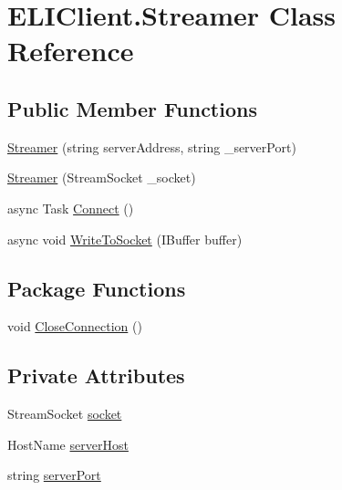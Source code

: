 \hypertarget{class_e_l_i_client_1_1_streamer}{}\section{E\+L\+I\+Client.\+Streamer Class Reference}
\label{class_e_l_i_client_1_1_streamer}
\subsection*{Public Member Functions}
\begin{DoxyCompactItemize}
\item 
\hyperlink{class_e_l_i_client_1_1_streamer_af385f8c92474d6dd8e62c7ac00b098a1}{Streamer} (string server\+Address, string \+\_\+server\+Port)
\item 
\hyperlink{class_e_l_i_client_1_1_streamer_aeed10276bc5127d45abbeb88aa03ac00}{Streamer} (Stream\+Socket \+\_\+socket)
\item 
async Task \hyperlink{class_e_l_i_client_1_1_streamer_aee0823494f123fb1a8ad2ab136cf74f5}{Connect} ()
\item 
async void \hyperlink{class_e_l_i_client_1_1_streamer_af88e4f7491aa8ca6cfdc6de6786fd89c}{Write\+To\+Socket} (I\+Buffer buffer)
\end{DoxyCompactItemize}
\subsection*{Package Functions}
\begin{DoxyCompactItemize}
\item 
void \hyperlink{class_e_l_i_client_1_1_streamer_a7825ae64d0072b8241d29d356befe42c}{Close\+Connection} ()
\end{DoxyCompactItemize}
\subsection*{Private Attributes}
\begin{DoxyCompactItemize}
\item 
Stream\+Socket \hyperlink{class_e_l_i_client_1_1_streamer_a3f9f039a53e135e6545efe8e336d23a6}{socket}
\item 
Host\+Name \hyperlink{class_e_l_i_client_1_1_streamer_aa8d1d426ed5fb8218b9dbdfd7d43b07f}{server\+Host}
\item 
string \hyperlink{class_e_l_i_client_1_1_streamer_ae6c3da0a3fb272c0a50260e4049659f0}{server\+Port}
\end{DoxyCompactItemize}


